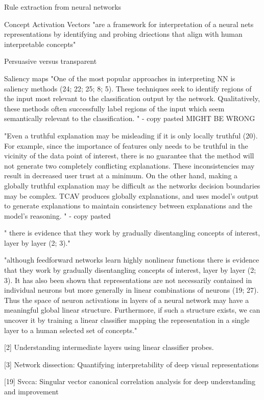 Rule extraction from neural networks

Concept Activation Vectors "are a framework for interpretation of a neural nets representations by identifying and probing driections that align with human interpretable concepts"

Persuasive versus transparent

Saliency maps "One of the most popular approaches in interpreting NN is saliency methods (24; 22; 25; 8; 5).
These techniques seek to identify regions of the input most relevant to the classification output by
the network. Qualitatively, these methods often successfully label regions of the input which seem
semantically relevant to the classification.
" - copy pasted MIGHT BE WRONG

"Even a truthful explanation may be misleading if it is only locally truthful (20). For example, since
the importance of features only needs to be truthful in the vicinity of the data point of interest, there
is no guarantee that the method will not generate two completely conflicting explanations. These
inconsistencies may result in decreased user trust at a minimum. On the other hand, making a
globally truthful explanation may be difficult as the networks decision boundaries may be complex.
TCAV produces globally explanations, and uses model’s output to generate explanations to maintain
consistency between explanations and the model’s reasoning.
" - copy pasted

" there is evidence that they work by gradually disentangling concepts of interest, layer by
layer (2; 3)."

"although feedforward networks learn highly nonlinear
functions there is evidence that they work by gradually disentangling concepts of interest, layer by
layer (2; 3). It has also been shown that representations are not necessarily contained in individual
neurons but more generally in linear combinations of neurons (19; 27). Thus the space of neuron
activations in layers of a neural network may have a meaningful global linear structure. Furthermore,
if such a structure exists, we can uncover it by training a linear classifier mapping the representation
in a single layer to a human selected set of concepts."

[2] Understanding intermediate layers using linear classifier
probes.

[3] Network dissection: Quantifying interpretability of deep visual representations

[19] Svcca: Singular
vector canonical correlation analysis for deep understanding and improvement

